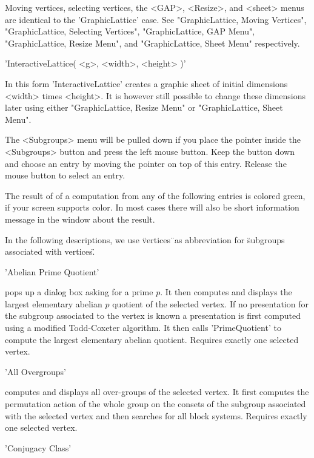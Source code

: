 Moving  vertices, selecting  vertices,  the <GAP>, <Resize>,  and <sheet>
menus are identical  to the 'GraphicLattice' case.   See "GraphicLattice,
Moving  Vertices", "GraphicLattice, Selecting Vertices", "GraphicLattice,
GAP Menu",  "GraphicLattice,   Resize Menu", and  "GraphicLattice,  Sheet
Menu" respectively.

'InteractiveLattice( <g>, <width>, <height> )'

In  this  form 'InteractiveLattice' creates   a  graphic sheet of initial
dimensions <width>  times <height>.   It   is however still possible   to
change these dimensions  later using either "GraphicLattice, Resize Menu"
or "GraphicLattice, Sheet Menu".


The <Subgroups> menu will be pulled down  if you place the pointer inside
the <Subgroups> button and press the  left mouse button.  Keep the button
down and  choose an entry by  moving  the pointer on   top of this entry.
Release the mouse button to select an entry.

The result of  of  a computation  from any  of  the following entries  is
colored green, if  your screen supports color.   In most cases there will
also be short information message in the {\GAP} window about the result.

In  the following descriptions, we  use \"vertices\"\ as abbreviation for
\"subgroups associated with vertices\".

'Abelian Prime Quotient'

pops  up a dialog  box asking  for a  prime  $p$.  It  then computes  and
displays the largest elementary   abelian  $p$ quotient of  the  selected
vertex.  If no presentation for the  subgroup associated to the vertex is
known   a presentation is  first computed  using  a modified Todd-Coxeter
algorithm.     It then calls    'PrimeQuotient' to   compute  the largest
elementary abelian quotient.  Requires exactly one selected vertex.

'All Overgroups'

computes and displays all over-groups  of the selected vertex.  It  first
computes the permutation action of the whole  group on the consets of the
subgroup associated with  the selected vertex and  then searches  for all
block systems.  Requires exactly one selected vertex.

'Conjugacy Class'

